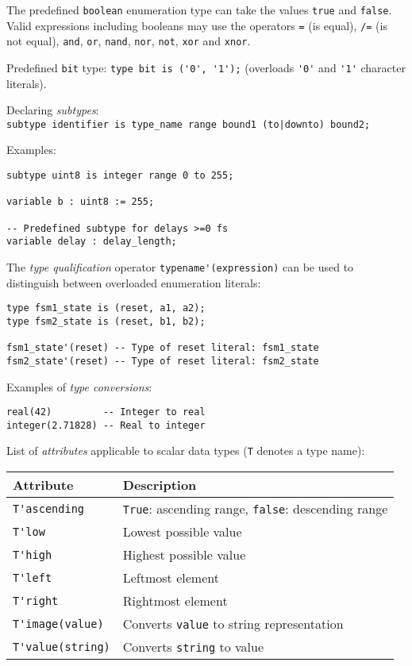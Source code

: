 \documentclass[fontsize=11pt,a4paper]{scrartcl}
\begin{document}
The predefined \lstinline!boolean! enumeration type can take the values \lstinline!true! and \lstinline!false!. Valid expressions including booleans may use the operators \lstinline!=! (is equal), \lstinline!/=! (is not equal), \lstinline!and!, \lstinline!or!, \lstinline!nand!, \lstinline!nor!, \lstinline!not!, \lstinline!xor! and \lstinline!xnor!.

Predefined \lstinline!bit! type: \lstinline!type bit is ('0', '1');! (overloads \lstinline!'0'! and \lstinline!'1'! character literals).

Declaring \emph{subtypes}:\\ \lstinline!subtype identifier is type_name range bound1 (to|downto) bound2;!

Examples:
\begin{lstlisting}
subtype uint8 is integer range 0 to 255;

variable b : uint8 := 255;

-- Predefined subtype for delays >=0 fs
variable delay : delay_length;
\end{lstlisting}

The \emph{type qualification} operator \lstinline!typename'(expression)! can be used to distinguish between overloaded enumeration literals:
\begin{lstlisting}
type fsm1_state is (reset, a1, a2);
type fsm2_state is (reset, b1, b2);

fsm1_state'(reset) -- Type of reset literal: fsm1_state
fsm2_state'(reset) -- Type of reset literal: fsm2_state
\end{lstlisting}

Examples of \emph{type conversions}:
\begin{lstlisting}
real(42)         -- Integer to real
integer(2.71828) -- Real to integer
\end{lstlisting}

List of \emph{attributes} applicable to scalar data types (\lstinline!T! denotes a type name):

\begin{tabular}{ll}
\toprule
	\textbf{Attribute} & \textbf{Description}\\
\midrule
	\lstinline!T'ascending! & \lstinline!True!: ascending range, \lstinline!false!: descending range \\
	\lstinline!T'low! & Lowest possible value\\
	\lstinline!T'high! & Highest possible value\\
	\lstinline!T'left! & Leftmost element\\
	\lstinline!T'right! & Rightmost element\\
	\lstinline!T'image(value)! & Converts \lstinline!value! to string representation\\
	\lstinline!T'value(string)! & Converts \lstinline!string! to value\\
\bottomrule
\end{tabular}
\end{document}
